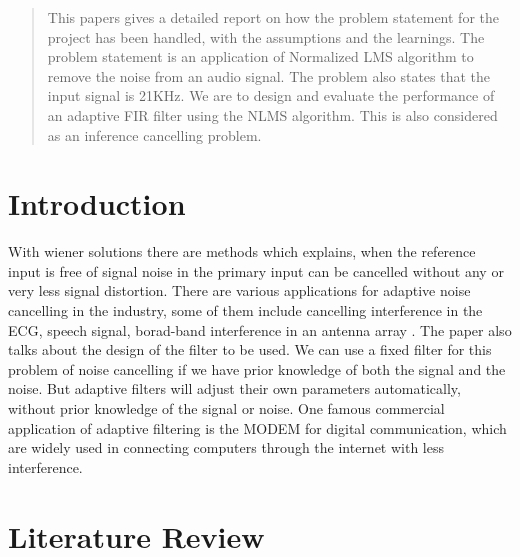 \documentclass[conference]{IEEEtran}
\begin{document}
\begin{abstract}
This papers gives a detailed report on how the problem statement for the project has been handled, with the assumptions and the learnings. The problem statement is an application of Normalized LMS algorithm to remove the noise from an audio signal. The problem also states that the input signal is 21KHz. We are to design and evaluate the performance of an adaptive FIR filter using the NLMS algorithm. This is also considered as an inference cancelling problem.

\end{abstract}





%
\IEEEpeerreviewmaketitle



\section{Introduction}
With wiener solutions there are methods which explains, when the reference input is free of signal noise in the primary input can be cancelled without any or very less signal distortion\cite{AdaptiveNoiseCancelling1975}. There are various applications for adaptive noise cancelling in the industry, some of them include cancelling interference in the ECG, speech signal, borad-band interference in an antenna array \cite{AdaptiveNoiseCancelling1975}. The paper \cite{AdaptiveNoiseCancelling1975} also talks about the design of the filter to be used. We can use a fixed filter for this problem of noise cancelling if we have prior knowledge of both the signal and the noise. But adaptive filters will adjust their own parameters automatically, without prior knowledge of the signal or noise. One famous commercial application of adaptive filtering is the MODEM for digital communication, which are widely used in connecting computers through the internet with less interference. 

\section{Literature Review}
\end{document}
